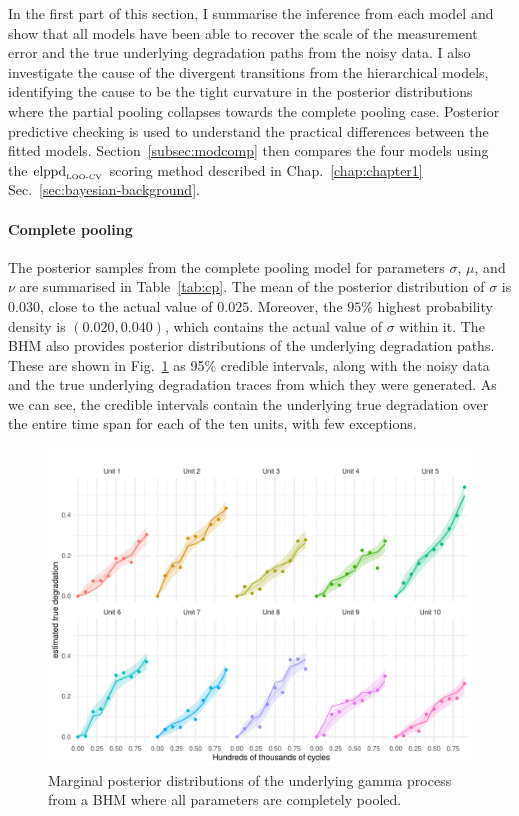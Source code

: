 In the first part of this section, I summarise the inference from each model and show that all models have been able to recover the scale of the measurement error and the true underlying degradation paths from the noisy data. I also investigate the cause of the divergent transitions from the hierarchical models, identifying the cause to be the tight curvature in the posterior distributions where the partial pooling collapses towards the complete pooling case. Posterior predictive checking is used to understand the practical differences between the fitted models. Section~\ref{subsec:modcomp} then compares the four models using the $\hbox{elppd}_{\text{\tiny{LOO-CV}}}$ scoring method described in Chap.~\ref{chap:chapter1} Sec.~\ref{sec:bayesian-background}.



\paragraph{Complete pooling} The posterior samples from the complete pooling model for parameters $\sigma$, $\mu$, and $\nu$ are summarised in Table~\ref{tab:cp}. The mean of the posterior distribution of $\sigma$ is $0.030$, close to the actual value of $0.025$. Moreover, the $95\%$ highest probability density is $(0.020, 0.040)$, which contains the actual value of $\sigma$ within it. The BHM also provides posterior distributions of the underlying degradation paths. These are shown in Fig.~\ref{fig:cp_filtered} as 95\% credible intervals, along with the noisy data and the true underlying degradation traces from which they were generated. As we can see, the credible intervals contain the underlying true degradation over the entire time span for each of the ten units, with few exceptions.



\begin{figure}
   \centering
   \includegraphics[width=0.8\columnwidth]{./figures/ch-5/plot-cp-filtered.pdf}
   \caption{Marginal posterior distributions of the underlying gamma process from a BHM where all parameters are completely pooled.}
   \label{fig:cp_filtered}
\end{figure}

